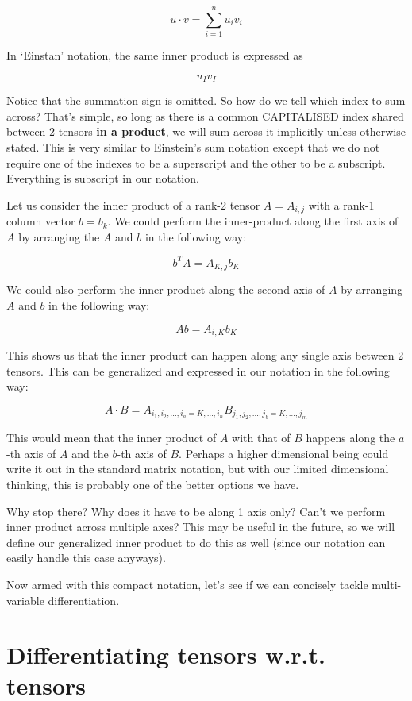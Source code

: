 \documentclass{article}
\begin{document}
\[u \cdot v = \sum_{i=1}^n u_iv_i\]

In `Einstan' notation, the same inner product is expressed as

\[u_Iv_I\]

Notice that the summation sign is omitted. So how do we tell which index to sum across? That's simple, so long as there is a common CAPITALISED index shared between 2 tensors \textbf{in a product}, we will sum across it implicitly unless otherwise stated. This is very similar to Einstein's sum notation except that we do not require one of the indexes to be a superscript and the other to be a subscript. Everything is subscript in our notation.

Let us consider the inner product of a rank-2 tensor \(A = A_{i,j}\) with a rank-1 column vector \(b = b_k\). We could perform the inner-product along the first axis of \(A\) by arranging the \(A\) and \(b\) in the following way:

\[b^TA = A_{K,j}b_K\]

We could also perform the inner-product along the second axis of \(A\) by arranging \(A\) and \(b\) in the following way:

\[Ab = A_{i, K}b_K\]

This shows us that the inner product can happen along any single axis between 2 tensors. This can be generalized and expressed in our notation in the following way:

\[A \cdot B = A_{i_1, i_2, \dots, i_a = K, \dots, i_n}B_{j_1, j_2, \dots, j_b = K, \dots, j_m}\]

This would mean that the inner product of \(A\) with that of \(B\) happens along the \(a\)-th axis of \(A\) and the \(b\)-th axis of \(B\). Perhaps a higher dimensional being could write it out in the standard matrix notation, but with our limited dimensional thinking, this is probably one of the better options we have.

Why stop there? Why does it have to be along 1 axis only? Can't we perform inner product across multiple axes? This may be useful in the future, so we will define our generalized inner product to do this as well (since our notation can easily handle this case anyways).

Now armed with this compact notation, let's see if we can concisely tackle multi-variable differentiation.

\section{Differentiating tensors w.r.t. tensors}
\end{document}
